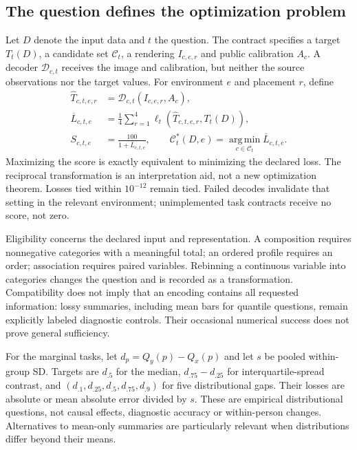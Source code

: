 \documentclass[11pt]{article}
\begin{document}
\subsection*{The question defines the optimization problem}
Let $D$ denote the input data and $t$ the question. The contract specifies a target $T_t(D)$, a candidate set $\mathcal C_t$, a rendering $I_{c,e,r}$ and public calibration $A_c$. A decoder $\mathcal D_{c,t}$ receives the image and calibration, but neither the source observations nor the target values. For environment $e$ and placement $r$, define
\begin{align}
\widehat T_{c,t,e,r}&=\mathcal D_{c,t}(I_{c,e,r},A_c),\\
\overline L_{c,t,e}&=\frac14\sum_{r=1}^{4}\ell_t\!\left(\widehat T_{c,t,e,r},T_t(D)\right),\\
S_{c,t,e}&=\frac{100}{1+\overline L_{c,t,e}},\qquad
\mathcal C_t^*(D,e)=\operatorname*{arg\,min}_{c\in\mathcal C_t}\overline L_{c,t,e}.
\label{eq:score}
\end{align}
Maximizing the score is exactly equivalent to minimizing the declared loss. The reciprocal transformation is an interpretation aid, not a new optimization theorem. Losses tied within $10^{-12}$ remain tied. Failed decodes invalidate that setting in the relevant environment; unimplemented task contracts receive no score, not zero.

Eligibility concerns the declared input and representation. A composition requires nonnegative categories with a meaningful total; an ordered profile requires an order; association requires paired variables. Rebinning a continuous variable into categories changes the question and is recorded as a transformation. Compatibility does not imply that an encoding contains all requested information: lossy summaries, including mean bars for quantile questions, remain explicitly labeled diagnostic controls. Their occasional numerical success does not prove general sufficiency.

For the marginal tasks, let $d_p=Q_y(p)-Q_x(p)$ and let $s$ be pooled within-group SD. Targets are $d_{.5}$ for the median, $d_{.75}-d_{.25}$ for interquartile-spread contrast, and $(d_{.1},d_{.25},d_{.5},d_{.75},d_{.9})$ for five distributional gaps. Their losses are absolute or mean absolute error divided by $s$. These are empirical distributional questions, not causal effects, diagnostic accuracy or within-person changes. Alternatives to mean-only summaries are particularly relevant when distributions differ beyond their means.\cite{weissgerber2015,rousselet2017}
\end{document}

